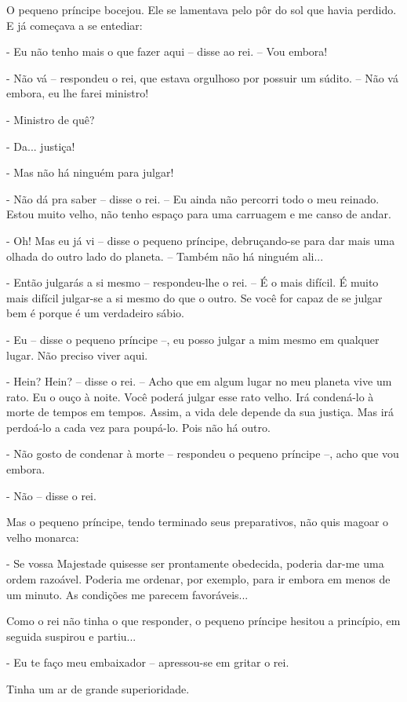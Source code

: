 O pequeno príncipe bocejou. Ele se lamentava pelo pôr do sol que havia
perdido. E já começava a se entediar:

- Eu não tenho mais o que fazer aqui -- disse ao rei. -- Vou embora!

- Não vá -- respondeu o rei, que estava orgulhoso por possuir um súdito.
-- Não vá embora, eu lhe farei ministro!

- Ministro de quê?

- Da... justiça!

- Mas não há ninguém para julgar!

- Não dá pra saber -- disse o rei. -- Eu ainda não percorri todo o meu
reinado. Estou muito velho, não tenho espaço para uma carruagem e me
canso de andar.

- Oh! Mas eu já vi -- disse o pequeno príncipe, debruçando-se para dar
mais uma olhada do outro lado do planeta. -- Também não há ninguém
ali...

- Então julgarás a si mesmo -- respondeu-lhe o rei. -- É o mais difícil.
É muito mais difícil julgar-se a si mesmo do que o outro. Se você for
capaz de se julgar bem é porque é um verdadeiro sábio.

- Eu -- disse o pequeno príncipe --, eu posso julgar a mim mesmo em
qualquer lugar. Não preciso viver aqui.

- Hein? Hein? -- disse o rei. -- Acho que em algum lugar no meu planeta
vive um rato. Eu o ouço à noite. Você poderá julgar esse rato velho. Irá
condená-lo à morte de tempos em tempos. Assim, a vida dele depende da
sua justiça. Mas irá perdoá-lo a cada vez para poupá-lo. Pois não há
outro.

- Não gosto de condenar à morte -- respondeu o pequeno príncipe --, acho
que vou embora.

- Não -- disse o rei.

Mas o pequeno príncipe, tendo terminado seus preparativos, não quis
magoar o velho monarca:

- Se vossa Majestade quisesse ser prontamente obedecida, poderia dar-me
uma ordem razoável. Poderia me ordenar, por exemplo, para ir embora em
menos de um minuto. As condições me parecem favoráveis...

Como o rei não tinha o que responder, o pequeno príncipe hesitou a
princípio, em seguida suspirou e partiu...

- Eu te faço meu embaixador -- apressou-se em gritar o rei.

Tinha um ar de grande superioridade.

